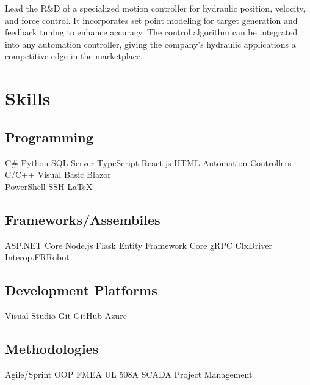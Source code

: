\documentclass{TTurner}
\begin{document}
\begin{minipage}[t]{0.75\textwidth}
\begin{tightemize}
\item Lead the R\&D of a specialized motion controller for hydraulic position, velocity, and force control. It incorporates set point modeling for target generation and feedback tuning to enhance accuracy. The control algorithm can be integrated into any automation controller, giving the company's hydraulic applications a competitive edge in the marketplace. 
\end{tightemize}
\sectionsep


\end{minipage} 
\hfill
\begin{minipage}[t]{0.23\textwidth} 

\section{Skills}
\subsection{Programming}
\sectionsep
{}
C\# \textbullet{} Python \textbullet{} SQL Server \textbullet{} TypeScript \textbullet{} React.js \textbullet{} HTML \textbullet{} Automation Controllers\\
\sectionsep
{}
C/C++ \textbullet{} Visual Basic \textbullet{} Blazor \textbullet{}\\
PowerShell \textbullet{} SSH \textbullet{} \LaTeX\\
\sectionsep
\sectionsep
\subsection{Frameworks/Assembiles}
\sectionsep
ASP.NET Core \textbullet{} Node.js \textbullet{} Flask \textbullet{} Entity Framework Core \textbullet{} gRPC \textbullet{} ClxDriver \textbullet{} Interop.FRRobot
\sectionsep
\sectionsep
\subsection{Development Platforms}
\sectionsep
Visual Studio \textbullet{} Git \textbullet{} GitHub \textbullet{} Azure\\
\sectionsep
\subsection{Methodologies}
\sectionsep
Agile/Sprint \textbullet{} OOP \textbullet{} FMEA \textbullet{} UL 508A \textbullet{} SCADA \textbullet{} Project Management\\
\sectionsep



\end{minipage}
\end{document}
